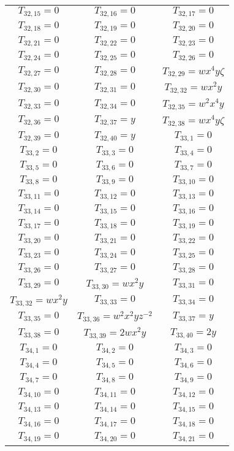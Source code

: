 \documentclass[12pt]{memoireuqam1.3}
\begin{document}
\begin{longtable}{|c|c|c|}
$T_{32,15}= 0$&
$T_{32,16}= 0$&
$T_{32,17}= 0$\\
$T_{32,18}= 0$&
$T_{32,19}= 0$&
$T_{32,20}= 0$\\
$T_{32,21}= 0$&
$T_{32,22}= 0$&
$T_{32,23}= 0$\\
$T_{32,24}= 0$&
$T_{32,25}= 0$&
$T_{32,26}= 0$\\
$T_{32,27}= 0$&
$T_{32,28}= 0$&
$T_{32,29}= wx^4y\zeta$\\
$T_{32,30}= 0$&
$T_{32,31}= 0$&
$T_{32,32}= wx^2y$\\
$T_{32,33}= 0$&
$T_{32,34}= 0$&
$T_{32,35}= w^2x^4y$\\
$T_{32,36}= 0$&
$T_{32,37}= y$&
$T_{32,38}= wx^4y\zeta$\\
$T_{32,39}= 0$&
$T_{32,40}= y$&
$T_{33,1}= 0$\\
$T_{33,2}= 0$&
$T_{33,3}= 0$&
$T_{33,4}= 0$\\
$T_{33,5}= 0$&
$T_{33,6}= 0$&
$T_{33,7}= 0$\\
$T_{33,8}= 0$&
$T_{33,9}= 0$&
$T_{33,10}= 0$\\
$T_{33,11}= 0$&
$T_{33,12}= 0$&
$T_{33,13}= 0$\\
$T_{33,14}= 0$&
$T_{33,15}= 0$&
$T_{33,16}= 0$\\
$T_{33,17}= 0$&
$T_{33,18}= 0$&
$T_{33,19}= 0$\\
$T_{33,20}= 0$&
$T_{33,21}= 0$&
$T_{33,22}= 0$\\
$T_{33,23}= 0$&
$T_{33,24}= 0$&
$T_{33,25}= 0$\\
$T_{33,26}= 0$&
$T_{33,27}= 0$&
$T_{33,28}= 0$\\
$T_{33,29}= 0$&
$T_{33,30}= wx^2y$&
$T_{33,31}= 0$\\
$T_{33,32}= wx^2y$&
$T_{33,33}= 0$&
$T_{33,34}= 0$\\
$T_{33,35}= 0$&
$T_{33,36}= w^2x^2yz^{-2}$&
$T_{33,37}= y$\\
$T_{33,38}= 0$&
$T_{33,39}= 2wx^2y$&
$T_{33,40}= 2y$\\
$T_{34,1}= 0$&
$T_{34,2}= 0$&
$T_{34,3}= 0$\\
$T_{34,4}= 0$&
$T_{34,5}= 0$&
$T_{34,6}= 0$\\
$T_{34,7}= 0$&
$T_{34,8}= 0$&
$T_{34,9}= 0$\\
$T_{34,10}= 0$&
$T_{34,11}= 0$&
$T_{34,12}= 0$\\
$T_{34,13}= 0$&
$T_{34,14}= 0$&
$T_{34,15}= 0$\\
$T_{34,16}= 0$&
$T_{34,17}= 0$&
$T_{34,18}= 0$\\
$T_{34,19}= 0$&
$T_{34,20}= 0$&
$T_{34,21}= 0$\\

\end{longtable}
\end{document}
